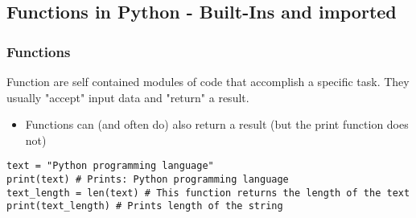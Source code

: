 \documentclass[10pt, a4paper]{beamer} %
\begin{document}
\subsection{Functions in Python - Built-Ins and imported} %
\label{sub:functions}
\begin{frame}
	\frametitle{Functions}
	Function are self contained modules of code that accomplish a specific task. They usually "accept" input data and "return" a result.
	\begin{itemize}
		\begin{lstlisting}
name = "Some name"
print(name) # Some name is used inside the print function -> the print function accepts the input and prints it to the console
    \end{lstlisting}
		\item Functions can (and often do) also return a result (but the print function does not)
	\end{itemize}

	\begin{examples}
		\begin{lstlisting}
text = "Python programming language"
print(text) # Prints: Python programming language
text_length = len(text) # This function returns the length of the text
print(text_length) # Prints length of the string
  \end{lstlisting}
	\end{examples}
\end{frame}
\end{document}
